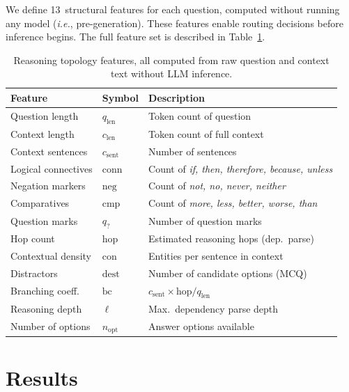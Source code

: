 \documentclass{article}
\newcommand{\ie}{\emph{i.e.},\xspace}
\begin{document}
We define 13~structural features for each question, computed without running
any model (\ie pre-generation). These features enable routing decisions before
inference begins. The full feature set is described in Table~\ref{tab:features}.

\begin{table}[t]
\centering
\caption{Reasoning topology features, all computed from raw question and
context text without LLM inference.}
\label{tab:features}
\small
\begin{tabular}{@{}llp{6.5cm}@{}}
\toprule
\textbf{Feature} & \textbf{Symbol} & \textbf{Description} \\
\midrule
Question length    & $q_\text{len}$  & Token count of question \\
Context length     & $c_\text{len}$  & Token count of full context \\
Context sentences  & $c_\text{sent}$ & Number of sentences \\
Logical connectives& $\mathrm{conn}$ & Count of \emph{if, then, therefore,
because, unless} \\
Negation markers   & $\mathrm{neg}$  & Count of \emph{not, no, never, neither}\\
Comparatives       & $\mathrm{cmp}$  & Count of \emph{more, less, better, worse,
than} \\
Question marks     & $q_?$           & Number of question marks \\
Hop count          & $\mathrm{hop}$  & Estimated reasoning hops (dep.\ parse) \\
Contextual density & $\mathrm{con}$  & Entities per sentence in context \\
Distractors        & $\mathrm{dest}$ & Number of candidate options (MCQ) \\
Branching coeff.   & $\mathrm{bc}$   & $c_\text{sent} \times \mathrm{hop} /
q_\text{len}$ \\
Reasoning depth    & $\ell$          & Max.\ dependency parse depth \\
Number of options  & $n_\text{opt}$  & Answer options available \\
\bottomrule
\end{tabular}
\end{table}

\section{Results}
\label{sec:results}
\end{document}
